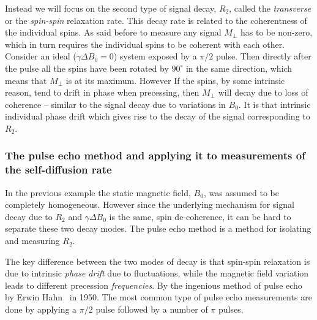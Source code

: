 \documentclass[11pt,a4paper, twocolumn,
swedish, english %
]{article}
\begin{document}
Instead we will focus on the second type of signal decay, $R_2$,
called the \emph{transverse} or the \emph{spin-spin} relaxation
rate. This decay rate is related to the coherentness of the individual
spins. As said before to measure any signal $M_\perp$ has to be
non-zero, which in turn requires the individual spins to be coherent
with each other. Consider an ideal ($\gamma\Delta B_0=0$) system
exposed by a $\pi/2$ pulse. Then directly after the pulse all the
spins have been rotated by $90^\circ$ in the same direction, which
means that $M_\perp$ is at its maximum. However If the spins, by some
intrinsic reason, tend to drift in phase when precessing, then
$M_\perp$ will decay due to loss of coherence -- similar to the signal
decay due to variations in $B_0$. It is that intrinsic individual
phase drift which gives rise to the decay of the signal corresponding
to $R_2$.  


\subsubsection{The pulse echo method and applying it to
measurements of the self-diffusion rate} 

In the previous example the static magnetic field, $B_0$, was assumed
to be completely homogeneous. However since the underlying mechanism
for signal decay due to $R_2$ and $\gamma\Delta B_0$ is the same, spin
de-coherence, it can be hard to separate these two decay modes. The
pulse echo method is a method for isolating  and measuring $R_2$. 

The key difference between the two modes of decay is that spin-spin
relaxation is due to intrinsic \emph{phase drift} due to fluctuations,
while the magnetic field variation leads to different precession
\emph{frequencies}. By the ingenious method of pulse echo by Erwin
Hahn~\cite{Hahn1950} in 1950. The most common type of pulse echo
measurements are done by applying a $\pi/2$ pulse followed by a number
of $\pi$ pulses.
\end{document}
